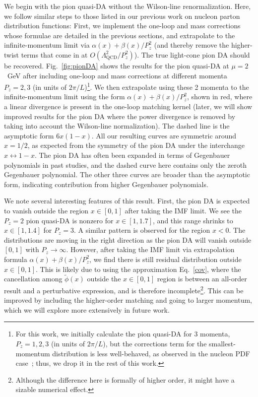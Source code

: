 We begin with the pion quasi-DA without the Wilson-line renormalization. Here, we follow similar steps to those listed in our previous work on nucleon parton distribution functions: First, we implement the one-loop and mass corrections whose formulae are detailed in the previous sections, and extrapolate to the infinite-momentum limit via {$\alpha(x)+\beta(x)/P_z^2$} (and thereby remove the higher-twist terms that come in at $O(\Lambda_\text{QCD}^2/P_z^2)$). The true light-cone pion DA should be recovered. 
Fig.~\ref{fig:pionDA} shows the results for the 
pion quasi-DA at $\mu=2$~GeV after including one-loop and mass corrections at different momenta $P_z=2, 3$ (in units of $2\pi/L$)\footnote{For this work, we initially calculate the pion quasi-DA for 3 momenta, $P_z= 1, 2, 3$ (in units of $2\pi/L$), but the corrections term for the smallest-momentum distribution is less well-behaved, as observed in the nucleon PDF case~\cite{Chen:2016utp}; thus, we drop it in the rest of this work.}. We then extrapolate using these 2 momenta to the infinite-momentum limit using the form {$\alpha(x)+\beta(x)/P_z^2$}, shown in red, where a linear divergence is present in the one-loop matching kernel (later, we will show improved results for the pion DA where the power divergence is removed by taking into account the Wilson-line normalization). The dashed line is the asymptotic form $6x(1-x)$. All our resulting curves are symmetric around $x=1/2$, as expected from the symmetry of the pion DA under the interchange $x\leftrightarrow 1-x$. The pion DA has often been expanded in terms of Gegenbauer polynomials in past studies, and the dashed curve here contains only the zeroth Gegenbauer polynomial. The other three curves are broader than the asymptotic form, indicating contribution from higher Gegenbauer polynomials.

We note several interesting features of this result.
First, the pion DA is expected to vanish outside the region $x\in [0,1]$ after taking the IMF limit. We see the $P_z=2$ pion quasi-DA is nonzero for $x\in [1,1.7]$, and this range shrinks to $x\in [1,1.4]$ for $P_z=3$. A similar pattern is observed for the region $x<0$. The distributions are moving in the right direction as the pion DA will vanish outside $[0,1]$ with $P_z \to \infty$. 
However, after taking the IMF limit via extrapolation formula $\alpha(x)+\beta(x)/P_z^2$, we find there is still residual distribution outside $x\in [0,1]$. 
This is likely due to using the approximation Eq.~\ref{cov}, where the cancellation among $\tilde\phi(x)$ outside the $x\in [0,1]$ region is between an all-order result and a perturbative expression, and is therefore incomplete\footnote{Although the difference here is formally of higher order, it might have a sizable numerical effect.}.
This can be improved by including the higher-order matching and going to larger momentum, which we will explore more extensively in future work.


